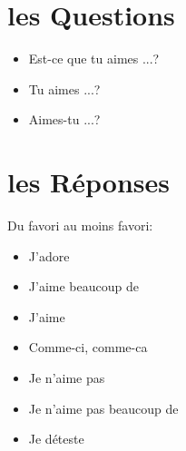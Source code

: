 \documentclass{article}
\begin{document}
\section{les Questions}
\begin{itemize}
\item Est-ce que tu aimes ...?
\item Tu aimes ...?
\item Aimes-tu ...?
\end{itemize}


\section{les Réponses}

Du favori au moins favori:

\begin{itemize}
\item J'adore
\item J'aime beaucoup de
\item J'aime
\item Comme-ci, comme-ca
\item Je n'aime pas
\item Je n'aime pas beaucoup de
\item Je déteste
\end{itemize}
\end{document}
